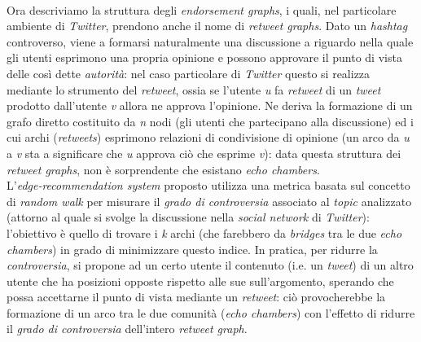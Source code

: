 \\Ora descriviamo la struttura degli \textit{endorsement graphs}, i quali, nel particolare ambiente di \textit{Twitter}, prendono anche il nome di \textit{retweet graphs}. Dato un \textit{hashtag} controverso, viene a formarsi naturalmente una discussione a riguardo nella quale gli utenti esprimono una propria opinione e possono approvare il punto di vista delle così dette \textit{autorità}: nel caso particolare di \textit{Twitter} questo si realizza mediante lo strumento del \textit{retweet}, ossia se l'utente \textit{u} fa \textit{retweet} di un \textit{tweet} prodotto dall'utente \textit{v} allora ne approva l'opinione. Ne deriva la formazione di un grafo diretto costituito da \textit{n} nodi (gli utenti che partecipano alla discussione) ed i cui archi (\textit{retweets}) esprimono relazioni di condivisione di opinione (un arco da \textit{u} a \textit{v} sta a significare che \textit{u} approva ciò che esprime \textit{v}): data questa struttura dei \textit{retweet graphs}, non è sorprendente che esistano \textit{echo chambers}. \\L'\textit{edge-recommendation system} proposto utilizza una metrica basata sul concetto di \textit{random walk} per misurare il \textit{grado di controversia} associato al \textit{topic} analizzato (attorno al quale si svolge la discussione nella \textit{social network} di \textit{Twitter}): l'obiettivo è quello di trovare i \textit{k} archi (che farebbero da \textit{bridges} tra le due \textit{echo chambers}) in grado di minimizzare questo indice. In pratica, per ridurre la \textit{controversia}, si propone ad un certo utente il contenuto (i.e. un \textit{tweet}) di un altro utente che ha posizioni opposte rispetto alle sue sull'argomento, sperando che possa accettarne il punto di vista mediante un \textit{retweet}: ciò provocherebbe la formazione di un arco tra le due comunità (\textit{echo chambers}) con l'effetto di ridurre il \textit{grado di controversia} dell'intero \textit{retweet graph}.  





%

